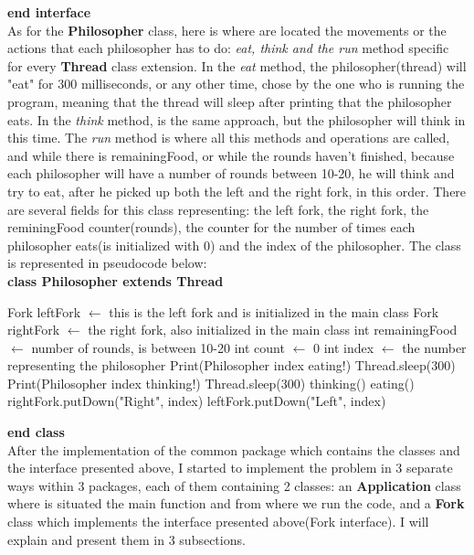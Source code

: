 \documentclass[14pt]{article}
\begin{document}
\textbf{end interface}
\vspace{2.5 mm}
\\As for the \textbf{Philosopher} class, here is where are located the movements or the actions that each philosopher has to do: \textit{eat, think and the run} method specific for every \textbf{Thread} class extension. In the \textit{eat} method, the philosopher(thread) will "eat" for 300 milliseconds, or any other time, chose by the one who is running the program, meaning that the thread will sleep after printing that the philosopher eats. In the \textit{think} method, is the same approach, but the philosopher will think in this time. The \textit{run} method is where all this methods and operations are called, and while there is remainingFood, or while the rounds haven't finished, because each philosopher will have a number of rounds between 10-20, he will think and try to eat, after he picked up both the left and the right fork, in this order. There are several fields for this class representing: the left fork, the right fork, the reminingFood counter(rounds), the counter for the number of times each philosopher eats(is initialized with 0) and the index of the philosopher. The class is represented in pseudocode below:
\vspace{2.5 mm}
\\\textbf{class Philosopher extends Thread}
\begin{algorithmic}
\State Fork leftFork $\gets$ this is the left fork and is initialized in the main class
\State Fork rightFork $\gets$ the right fork, also initialized in the main class
\State int remainingFood $\gets$ number of rounds, is between 10-20
\State int count $\gets$ 0
\State int index $\gets$ the number representing the philosopher
    \State Print(Philosopher index eating!)
    \State Thread.sleep(300)
\EndFunction
\vspace{1 mm}
    \State Print(Philosopher index thinking!)
    \State Thread.sleep(300)
\EndFunction
\vspace{1 mm}
        \State thinking()
                \State eating()
                \State rightFork.putDown("Right", index)
            \EndIf
             \State leftFork.putDown("Left", index)
        \EndIf
    \EndFor
\EndFunction
\end{algorithmic}
\textbf{end class}
\vspace{2.5 mm}
\\After the implementation of the common package which contains the classes and the interface presented above, I started to implement the problem in 3 separate ways  within  3  packages,  each  of  them  containing  2  classes:  an \textbf{Application} class where is situated the main function and from where we run the code, and a \textbf{Fork} class which implements the interface presented above(Fork interface). I will explain and present them in 3 subsections.
\end{document}
